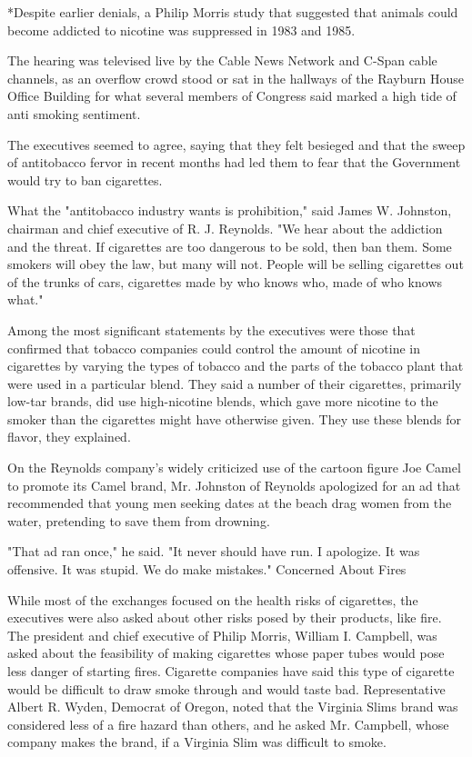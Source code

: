 *Despite earlier denials, a Philip Morris study that suggested that
animals could become addicted to nicotine was suppressed in 1983 and
1985.

The hearing was televised live by the Cable News Network and C-Span
cable channels, as an overflow crowd stood or sat in the hallways of the
Rayburn House Office Building for what several members of Congress said
marked a high tide of anti smoking sentiment.

The executives seemed to agree, saying that they felt besieged and that
the sweep of antitobacco fervor in recent months had led them to fear
that the Government would try to ban cigarettes.

What the "antitobacco industry wants is prohibition," said James W.
Johnston, chairman and chief executive of R. J. Reynolds. "We hear about
the addiction and the threat. If cigarettes are too dangerous to be
sold, then ban them. Some smokers will obey the law, but many will not.
People will be selling cigarettes out of the trunks of cars, cigarettes
made by who knows who, made of who knows what."

Among the most significant statements by the executives were those that
confirmed that tobacco companies could control the amount of nicotine in
cigarettes by varying the types of tobacco and the parts of the tobacco
plant that were used in a particular blend. They said a number of their
cigarettes, primarily low-tar brands, did use high-nicotine blends,
which gave more nicotine to the smoker than the cigarettes might have
otherwise given. They use these blends for flavor, they explained.

On the Reynolds company's widely criticized use of the cartoon figure
Joe Camel to promote its Camel brand, Mr. Johnston of Reynolds
apologized for an ad that recommended that young men seeking dates at
the beach drag women from the water, pretending to save them from
drowning.

"That ad ran once," he said. "It never should have run. I apologize. It
was offensive. It was stupid. We do make mistakes." Concerned About
Fires

While most of the exchanges focused on the health risks of cigarettes,
the executives were also asked about other risks posed by their
products, like fire. The president and chief executive of Philip Morris,
William I. Campbell, was asked about the feasibility of making
cigarettes whose paper tubes would pose less danger of starting fires.
Cigarette companies have said this type of cigarette would be difficult
to draw smoke through and would taste bad. Representative Albert R.
Wyden, Democrat of Oregon, noted that the Virginia Slims brand was
considered less of a fire hazard than others, and he asked Mr. Campbell,
whose company makes the brand, if a Virginia Slim was difficult to
smoke.

